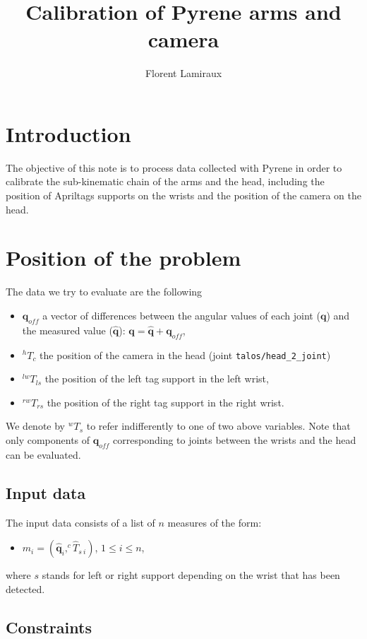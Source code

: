 \documentclass {article}
\title {Calibration of Pyrene arms and camera}
\author {Florent Lamiraux}
\date {}
\newcommand\conf{\mathbf{q}}
\newcommand\confoffset{\mathbf{q}_{off}}
\newcommand\transf{T}
\begin{document}
\maketitle
\section {Introduction}

The objective of this note is to process data collected with Pyrene in order
to calibrate the sub-kinematic chain of the arms and the head, including the
position of Apriltags supports on the wrists and the position of the camera on the head.

\section {Position of the problem}

The data we try to evaluate are the following
\begin{itemize}
\item $\confoffset$ a vector of differences between the angular values of each joint ($\conf$) and the measured value ($\hat{\conf}$): $\conf = \hat{\conf} + \confoffset$,
\item $^{h}\transf_{c}$ the position of the camera in the head (joint \texttt{talos/head\_2\_joint})
\item $^{lw}\transf_{ls}$ the position of the left tag support in the left wrist,
\item $^{rw}\transf_{rs}$ the position of the right tag support in the right
  wrist.
\end{itemize}
We denote by $^{w}\transf_{s}$ to refer indifferently to one of two above variables.
Note that only components of $\confoffset$ corresponding to joints between the wrists and the head can be evaluated.

\subsection {Input data}

The input data consists of a list of $n$ measures of the form:
\begin{itemize}
  \item $m_i = (\hat{\conf}_i, ^{c}\hat\transf_{s\ i})$, $1 \leq i \leq n$,
\end{itemize}
where $s$ stands for left or right support depending on the wrist that has been detected.

\subsection {Constraints}
\end{document}
